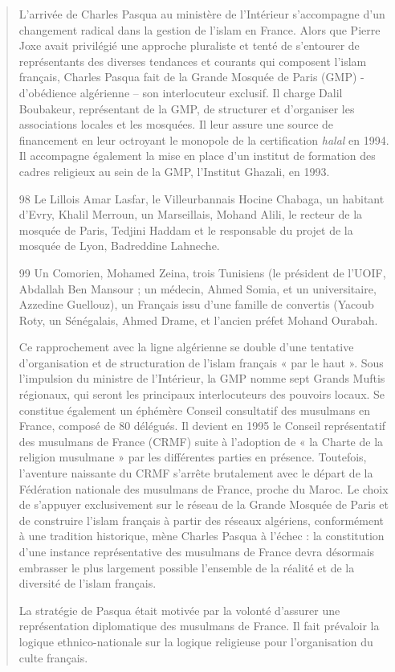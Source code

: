 \begin{quote}
L'arrivée de Charles Pasqua au ministère de l'Intérieur s'accompagne
d'un changement radical dans la gestion de l'islam en France. Alors que
Pierre Joxe avait privilégié une approche pluraliste et tenté de
s'entourer de représentants des diverses tendances et courants qui
composent l'islam français, Charles Pasqua fait de la Grande Mosquée de
Paris (GMP) - d'obédience algérienne -- son interlocuteur exclusif. Il
charge Dalil Boubakeur, représentant de la GMP, de structurer et
d'organiser les associations locales et les mosquées. Il leur assure une
source de financement en leur octroyant le monopole de la certification
\emph{halal} en 1994. Il accompagne également la mise en place d'un
institut de formation des cadres religieux au sein de la GMP, l'Institut
Ghazali, en 1993.

98 Le Lillois Amar Lasfar, le Villeurbannais Hocine Chabaga, un habitant
d'Evry, Khalil Merroun, un Marseillais, Mohand Alili, le recteur de la
mosquée de Paris, Tedjini Haddam et le responsable du projet de la
mosquée de Lyon, Badreddine Lahneche.

99 Un Comorien, Mohamed Zeina, trois Tunisiens (le président de l'UOIF,
Abdallah Ben Mansour ; un médecin, Ahmed Somia, et un universitaire,
Azzedine Guellouz), un Français issu d'une famille de convertis (Yacoub
Roty, un Sénégalais, Ahmed Drame, et l'ancien préfet Mohand Ourabah.



Ce rapprochement avec la ligne algérienne se double d'une tentative
d'organisation et de structuration de l'islam français « par le haut ».
Sous l'impulsion du ministre de l'Intérieur, la GMP nomme sept Grands
Muftis régionaux, qui seront les principaux interlocuteurs des pouvoirs
locaux. Se constitue également un éphémère Conseil consultatif des
musulmans en France, composé de 80 délégués. Il devient en 1995 le
Conseil représentatif des musulmans de France (CRMF) suite à l'adoption
de « la Charte de la religion musulmane » par les différentes parties en
présence. Toutefois, l'aventure naissante du CRMF s'arrête brutalement
avec le départ de la Fédération nationale des musulmans de France,
proche du Maroc. Le choix de s'appuyer exclusivement sur le réseau de la
Grande Mosquée de Paris et de construire l'islam français à partir des
réseaux algériens, conformément à une tradition historique, mène Charles
Pasqua à l'échec : la constitution d'une instance représentative des
musulmans de France devra désormais embrasser le plus largement possible
l'ensemble de la réalité et de la diversité de l'islam français.

La stratégie de Pasqua était motivée par la volonté d'assurer une
représentation diplomatique des musulmans de France. Il fait prévaloir
la logique ethnico-nationale sur la logique religieuse pour
l'organisation du culte français.
\end{quote}

